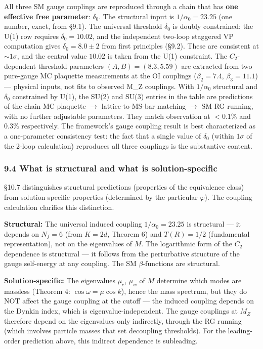 \documentclass[
  11pt,
]{article}
\begin{document}
All three SM gauge couplings are reproduced through a chain that has
\textbf{one effective free parameter}: \(\delta_0\). The structural
input is \(1/\alpha_0 = 23.25\) (one number, exact, from §9.1). The
universal threshold \(\delta_0\) is doubly constrained: the U(1) row
requires \(\delta_0 = 10.02\), and the independent two-loop staggered VP
computation gives \(\delta_0 = 8.0 \pm 2\) from first principles (§9.2).
These are consistent at \(\sim 1\sigma\), and the central value
\(10.02\) is taken from the U(1) constraint. The \(C_2\)-dependent
threshold parameters \((A, B) = (8.3, 5.59)\) are extracted from two
pure-gauge MC plaquette measurements at the OI couplings
(\(\beta_2 = 7.4\), \(\beta_3 = 11.1\)) --- physical inputs, not fits to
observed M\_Z couplings. With \(1/\alpha_0\) structural and \(\delta_0\)
constrained by U(1), the SU(2) and SU(3) entries in the table are
predictions of the chain MC plaquette \(\to\) lattice-to-MS-bar matching
\(\to\) SM RG running, with no further adjustable parameters. They match
observation at \(<0.1\%\) and \(0.3\%\) respectively. The framework's
gauge coupling result is best characterized as a one-parameter
consistency test: the fact that a single value of \(\delta_0\) (within
\(1\sigma\) of the 2-loop calculation) reproduces all three couplings is
the substantive content.

\hypertarget{what-is-structural-and-what-is-solution-specific}{%
\subsubsection{9.4 What is structural and what is
solution-specific}\label{what-is-structural-and-what-is-solution-specific}}

§10.7 distinguishes structural predictions (properties of the
equivalence class) from solution-specific properties (determined by the
particular \(\varphi\)). The coupling calculation clarifies this
distinction.

\textbf{Structural:} The universal induced coupling
\(1/\alpha_0 = 23.25\) is structural --- it depends on \(N_f = 6\) (from
\(K = 2d\), Theorem 6) and \(T(R) = 1/2\) (fundamental representation),
not on the eigenvalues of \(M\). The logarithmic form of the \(C_2\)
dependence is structural --- it follows from the perturbative structure
of the gauge self-energy at any coupling. The SM \(\beta\)-functions are
structural.

\textbf{Solution-specific:} The eigenvalues \(\mu_c\), \(\mu_w\) of
\(M\) determine which modes are massless (Theorem 4:
\(\cos\omega = \mu \cos k\)), hence the mass spectrum, but they do NOT
affect the gauge coupling at the cutoff --- the induced coupling depends
on the Dynkin index, which is eigenvalue-independent. The gauge
couplings at \(M_Z\) therefore depend on the eigenvalues only
indirectly, through the RG running (which involves particle masses that
set decoupling thresholds). For the leading-order prediction above, this
indirect dependence is subleading.
\end{document}
